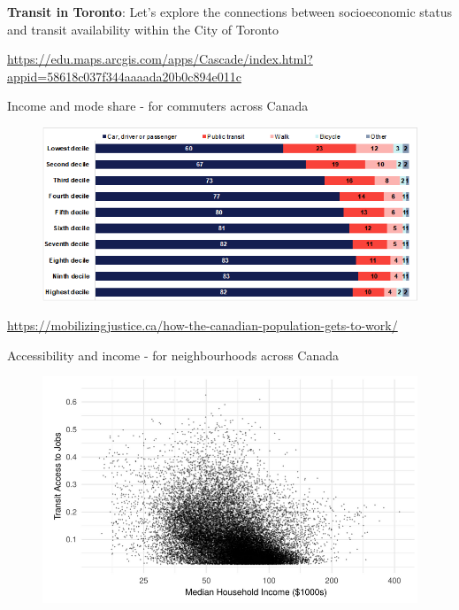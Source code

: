 \documentclass[aspectratio=169]{beamer}
\begin{document}
\begin{frame}
	
	
	\textbf{Transit in Toronto}: Let's explore the connections between socioeconomic status and transit availability within the City of Toronto
	
	\vspace{2mm}
	
	
	\url{https://edu.maps.arcgis.com/apps/Cascade/index.html?appid=58618c037f344aaaada20b0c894e011c}
	
	
\end{frame}




\begin{frame}
	
	Income and mode share - for commuters across Canada
	
	\begin{figure}
		\centering
		\includegraphics[width=0.94\linewidth]{images/income_mode_canada.png}
	\end{figure}
	
	\tiny\url{https://mobilizingjustice.ca/how-the-canadian-population-gets-to-work/}
	
\end{frame}










\begin{frame}
	
	Accessibility and income - for neighbourhoods across Canada
	
	\begin{figure}
		\centering
		\includegraphics[width=0.94\linewidth]{images/access_income.png}
	\end{figure}
	
\end{frame}
\end{document}
